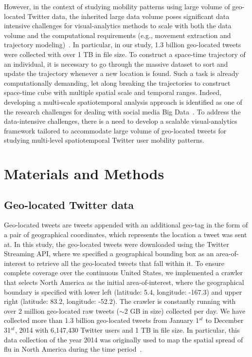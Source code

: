 \documentclass[ijgi,article,accept,moreauthors,pdftex,10pt,a4paper]{mdpi}
\theoremstyle{mdpi}
\newcounter{ex}
\newcounter{re}
\theoremstyle{mdpidefinition}
\begin{document}
However, in the context of studying mobility patterns using large volume of geo-located Twitter data, the inherited large data volume poses significant data intensive challenges for visual-analytics methods to scale with both the data volume and the computational requirements (e.g., movement extraction and trajectory modeling)~\cite{cao2014scalable}.
In particular, in our study, 1.3 billion geo-located tweets were collected with over 1 TB in file size.
To construct a space-time trajectory of an individual, it is necessary to go through the massive dataset to sort and update the trajectory whenever a new location is found.
Such a task is already computationally demanding, let along breaking the trajectories to construct space-time cube with multiple spatial scale and temporal ranges.
Indeed, developing a multi-scale spatiotemporal analysis approach is identified as one of the research challenges for dealing with social media Big Data~\cite{tsou2015}.
To address the data-intensive challenges, there is a need to develop a scalable visual-analytics framework tailored to accommodate large volume of geo-located tweets for studying multi-level spatiotemporal Twitter user mobility patterns.

\section{Materials and Methods}
\subsection{Geo-located Twitter data}
Geo-located tweets are tweets appended with an additional geo-tag in the form of a pair of geographical coordinates, which represents the location a tweet was sent at.
In this study, the geo-located tweets were downloaded using the Twitter Streaming API, where we specified a geographical bounding box as an area-of-interest to retrieve all the geo-located tweets that fall within it.
To ensure complete coverage over the continuous United States, we implemented a crawler that selects North America as the initial area-of-interest, where the geographical boundary is specified with lower left (latitude: 5.4, longitude: -167.3) and upper right (latitude: 83.2, longitude: -52.2).
The crawler is constantly running with over 2 million geo-located raw tweets ($\sim$2 GB in size) collected per day.
We have collected more than 1.3 billion geo-located tweets from January 1$^{st}$ to December 31$^{st}$, 2014 with 6,147,430 Twitter users and 1 TB in file size.
In particular, this data collection of the year 2014 was originally used to map the spatial spread of flu in North America during the time period~\cite{padmanabhan2014flumapper}.
\end{document}
